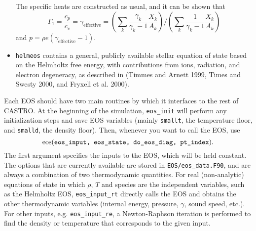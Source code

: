 \begin{itemize}
The specific heats are constructed as usual, and it can be shown that
\begin{equation}
\Gamma_1 = \frac{c_p}{c_v} = \gamma_\mathrm{effective} =
   \left ( \sum_k \frac{\gamma_k}{\gamma_k - 1} \frac{X_k}{A_k} \right ) \bigg /
   \left ( \sum_k \frac{1}{\gamma_k - 1} \frac{X_k}{A_k} \right )
\end{equation}
and $p = \rho e (\gamma_\mathrm{effective} - 1)$.

\item {\tt helmeos} contains a general, publicly available
stellar equation of state based on the Helmholtz free energy,
with contributions from ions, radiation, and electron degeneracy, as
described in (Timmes and Arnett 1999, Times and Swesty 2000, and Fryxell et al. 2000).

\end{itemize}

Each EOS should have two main routines by which it interfaces to the
rest of CASTRO.  At the beginning of the simulation, {\tt eos\_init}
will perform any initialization steps and save EOS variables (mainly
\texttt{smallt}, the temperature floor, and \texttt{smalld}, the
density floor). Then, whenever you want to call the EOS, use
\[
{\bf \rm eos}(\texttt{eos\_input, eos\_state, do\_eos\_diag, pt\_index}).
\]
The first argument specifies the inputs to the EOS, which will be held constant. The options that are currently available are stored in \texttt{EOS/eos\_data.F90}, and are always a combination of two thermodynamic quantities. For real (non-analytic) equations of state in which $\rho$, $T$ and species are the independent variables, such as the Helmholtz EOS, \texttt{eos\_input\_rt} directly calls the EOS and obtains the other thermodynamic variables (internal energy, pressure, $\gamma$, sound speed, etc.). For other inputs, e.g. \texttt{eos\_input\_re}, a Newton-Raphson iteration is performed to find the density or temperature that corresponds to the given input.


